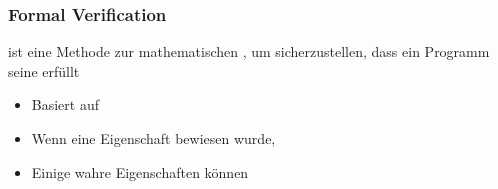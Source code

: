 \subsubsection*{Formal Verification}
\begin{infoBox}
     ist eine Methode zur mathematischen , um sicherzustellen, dass ein Programm seine  erfüllt
\end{infoBox}
\begin{infoBox}[title=Warum formale Verifikation?]
    \begin{itemize}
        \item {} Basiert auf 
        \item {} Wenn eine Eigenschaft bewiesen wurde, 
        \item {} Einige wahre Eigenschaften können 
    \end{itemize}
\end{infoBox}
